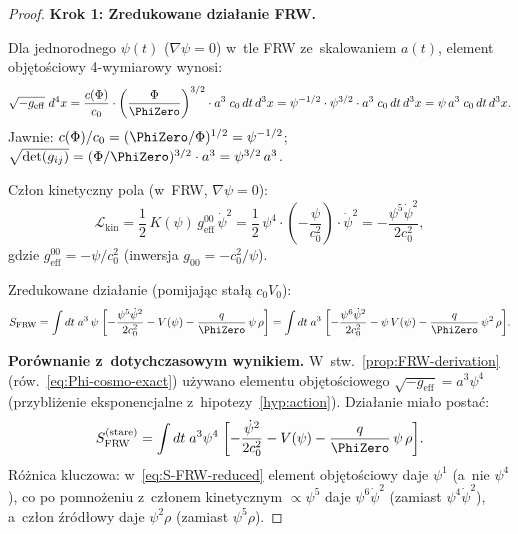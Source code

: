 \begin{proof}
\textbf{Krok 1: Zredukowane dzia\l{}anie FRW.}

Dla jednorodnego $\psi(t)$ ($\nabla\psi = 0$) w~tle FRW
ze~skalowaniem $a(t)$, element obj\k{e}to\'sciowy 4-wymiarowy wynosi:
\begin{equation}\label{eq:volume-FRW}
  \sqrt{-g_{\mathrm{eff}}}\;d^4x
  = \frac{c(\Phi)}{c_0}\cdot\left(\frac{\Phi}{\PhiZero}\right)^{3/2}
    \cdot a^3\;c_0\,dt\,d^3x
  = \psi^{-1/2}\cdot\psi^{3/2}\cdot a^3\;c_0\,dt\,d^3x
  = \psi\,a^3\;c_0\,dt\,d^3x.
\end{equation}
Jawnie: $c(\Phi)/c_0 = (\PhiZero/\Phi)^{1/2} = \psi^{-1/2}$;
$\sqrt{\det(g_{ij})} = (\Phi/\PhiZero)^{3/2}\cdot a^3 = \psi^{3/2}\,a^3$.

Cz\l{}on kinetyczny pola (w~FRW, $\nabla\psi = 0$):
\begin{equation}\label{eq:Lkin-FRW}
  \mathcal{L}_{\mathrm{kin}}
  = \frac{1}{2}\,K(\psi)\,g_{\mathrm{eff}}^{00}\,\dot\psi^2
  = \frac{1}{2}\,\psi^4\cdot\left(-\frac{\psi}{c_0^2}\right)\cdot\dot\psi^2
  = -\frac{\psi^5\dot\psi^2}{2c_0^2},
\end{equation}
gdzie $g_{\mathrm{eff}}^{00} = -\psi/c_0^2$
(inwersja $g_{00} = -c_0^2/\psi$).

Zredukowane dzia\l{}anie (pomijaj\k{a}c sta\l{}\k{a} $c_0 V_0$):
\begin{equation}\label{eq:S-FRW-reduced}
  S_{\mathrm{FRW}}
  = \int dt\;a^3\,\psi\;\biggl[
    -\frac{\psi^5\dot\psi^2}{2c_0^2}
    - V(\psi)
    - \frac{q}{\PhiZero}\,\psi\,\rho
  \biggr]
  = \int dt\;a^3\;\biggl[
    -\frac{\psi^6\dot\psi^2}{2c_0^2}
    - \psi\,V(\psi)
    - \frac{q}{\PhiZero}\,\psi^2\,\rho
  \biggr].
\end{equation}

\medskip\noindent\textbf{Por\'ownanie z~dotychczasowym wynikiem.}
W~stw.~\ref{prop:FRW-derivation} (r\'ow.~\eqref{eq:Phi-cosmo-exact})
u\.zywano elementu obj\k{e}to\'sciowego $\sqrt{-g_{\mathrm{eff}}} = a^3\psi^4$
(przybli\.zenie eksponencjalne z~hipotezy~\ref{hyp:action}).
Dzia\l{}anie mia\l{}o posta\'c:
\[
  S_{\mathrm{FRW}}^{(\mathrm{stare})}
  = \int dt\;a^3\psi^4\;\biggl[
    -\frac{\dot\psi^2}{2c_0^2}
    - V(\psi)
    - \frac{q}{\PhiZero}\,\psi\,\rho
  \biggr].
\]
R\'o\.znica kluczowa: w~\eqref{eq:S-FRW-reduced}
element obj\k{e}to\'sciowy daje $\psi^1$ (a~nie $\psi^4$),
co po pomno\.zeniu z~cz\l{}onem kinetycznym $\propto \psi^5$
daje $\psi^6\dot\psi^2$ (zamiast $\psi^4\dot\psi^2$),
a~cz\l{}on \'zr\'od\l{}owy daje $\psi^2\rho$ (zamiast $\psi^5\rho$).


\end{proof}

